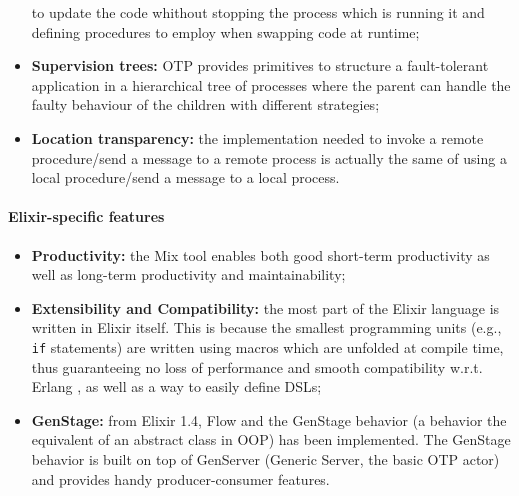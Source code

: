 \begin{itemize}
        to update the code whithout stopping the process which is running it
        and defining procedures to employ when swapping code at runtime;
    \item \textbf{Supervision trees:} OTP provides primitives to structure a
        fault-tolerant application in a hierarchical tree of processes where
        the parent can handle the faulty behaviour of the children with
        different strategies;
    \item \textbf{Location transparency:} the implementation needed to invoke a
        remote procedure/send a message to a remote process is actually the same
        of using a local procedure/send a message to a local process.
\end{itemize}

\paragraph{Elixir-specific features}
\begin{itemize}
  \item \textbf{Productivity:} the Mix tool enables both good short-term
        productivity as well as long-term productivity and maintainability;
  \item \textbf{Extensibility and Compatibility:} the most part of the Elixir
        language is written in Elixir itself. This is because the smallest
        programming units (e.g., \texttt{if} statements) are written using
        macros which are unfolded at compile time, thus guaranteeing no loss of
        performance and smooth compatibility w.r.t. Erlang , as well as a way
        to easily define DSLs;
  \item \textbf{GenStage:} from Elixir 1.4, Flow and the GenStage behavior
        (a behavior the equivalent of an abstract class in OOP) has been
        implemented.
        The GenStage behavior is built on top of GenServer (Generic
        Server, the basic OTP actor) and provides handy producer-consumer
        features.
\end{itemize}
